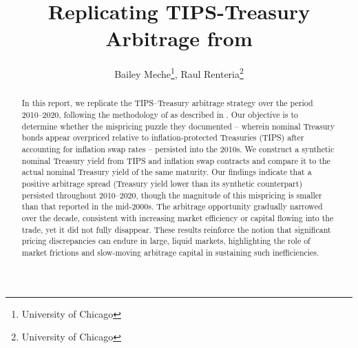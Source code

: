 \documentclass[12pt]{article}
\begin{document}
\title{
Replicating TIPS-Treasury Arbitrage from \cite{SegmentedArb}
}

\author{
Bailey Meche\footnote{University of Chicago}, 
Raul Renteria\footnote{University of Chicago}
}
\begin{titlepage}
% 
\maketitle


\doublespacing
\begin{abstract}
  In this report, we replicate the TIPS–Treasury arbitrage strategy over the period 2010–2020, 
  following the methodology of \cite{Fleckenstein} as described in \cite{SegmentedArb}. Our objective is to determine whether the mispricing 
  puzzle they documented – wherein nominal Treasury bonds appear overpriced relative to inflation-protected Treasuries (TIPS) 
  after accounting for inflation swap rates – persisted into the 2010s. We construct a synthetic nominal Treasury 
  yield from TIPS and inflation swap contracts and compare it to the actual nominal Treasury yield of the same maturity. 
  Our findings indicate that a positive arbitrage spread (Treasury yield lower than its synthetic counterpart) persisted 
  throughout 2010–2020, though the magnitude of this mispricing is smaller than that reported in the mid-2000s. The arbitrage
   opportunity gradually narrowed over the decade, consistent with increasing market efficiency or capital flowing into the trade, 
   yet it did not fully disappear. These results reinforce the notion that significant pricing discrepancies can endure in large, 
   liquid markets, highlighting the role of market frictions and slow-moving arbitrage capital in sustaining such inefficiencies.
\end{abstract}


\end{titlepage}
\end{document}
